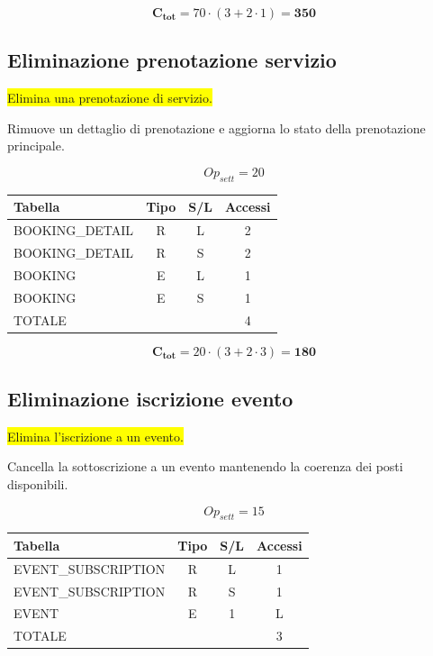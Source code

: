 \documentclass[a4paper,12pt]{report}
\begin{document}
$$\mathbf{C_{tot}} = 70 \cdot (3 + 2 \cdot 1) = \mathbf{350}$$

\subsection*{Eliminazione prenotazione servizio} \label{op16}
\colorbox{yellow}{Elimina una prenotazione di servizio.}

Rimuove un dettaglio di prenotazione e aggiorna lo stato della
prenotazione principale.

$$Op_{sett} = 20$$

\begin{table}[H]
  \centering
  \small
  \renewcommand{\arraystretch}{1.15}
  \begin{tabularx}{0.7\textwidth}{|X|c|c|c|}
    \hline
    \rowcolor{gray!20}
    \textbf{Tabella} & \textbf{Tipo} & \textbf{S/L} & \textbf{Accessi} \\
    \hline
    BOOKING\_DETAIL & R & L & 2 \\
    BOOKING\_DETAIL & R & S & 2 \\
    BOOKING & E & L & 1 \\
    BOOKING & E & S & 1 \\
    \hline
    \rowcolor{gray!20}
    TOTALE & & & 4 \\
    \hline
  \end{tabularx}
  \vspace{-1em}
\end{table}

$$\mathbf{C_{tot}} = 20 \cdot (3 + 2 \cdot 3) = \mathbf{180}$$

\subsection*{Eliminazione iscrizione evento} \label{op17}
\colorbox{yellow}{Elimina l'iscrizione a un evento.}

Cancella la sottoscrizione a un evento mantenendo la coerenza dei
posti disponibili.

$$Op_{sett} = 15$$

\begin{table}[H]
  \centering
  \small
  \renewcommand{\arraystretch}{1.15}
  \begin{tabularx}{0.7\textwidth}{|X|c|c|c|}
    \hline
    \rowcolor{gray!20}
    \textbf{Tabella} & \textbf{Tipo} & \textbf{S/L} & \textbf{Accessi} \\
    \hline
    EVENT\_SUBSCRIPTION & R & L & 1 \\
    EVENT\_SUBSCRIPTION & R & S & 1 \\
    EVENT & E & 1 & L \\
    \hline
    \rowcolor{gray!20}
    TOTALE & & & 3 \\
    \hline
  \end{tabularx}
  \vspace{-1em}
\end{table}
\end{document}
